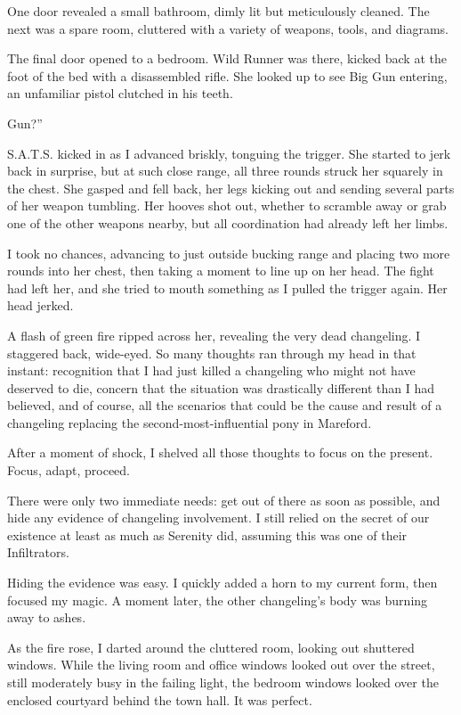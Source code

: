 One door revealed a small bathroom, dimly lit but meticulously cleaned. The next was a spare room, cluttered with a variety of weapons, tools, and diagrams.

The final door opened to a bedroom. Wild Runner was there, kicked back at the foot of the bed with a disassembled rifle. She looked up to see Big Gun entering, an unfamiliar pistol clutched in his teeth.

\leavevmode{}Gun?”

S.A.T.S. kicked in as I advanced briskly, tonguing the trigger. She started to jerk back in surprise, but at such close range, all three rounds struck her squarely in the chest. She gasped and fell back, her legs kicking out and sending several parts of her weapon tumbling. Her hooves shot out, whether to scramble away or grab one of the other weapons nearby, but all coordination had already left her limbs.

I took no chances, advancing to just outside bucking range and placing two more rounds into her chest, then taking a moment to line up on her head. The fight had left her, and she tried to mouth something as I pulled the trigger again. Her head jerked.

A flash of green fire ripped across her, revealing the very dead changeling. I staggered back, wide-eyed. So many thoughts ran through my head in that instant: recognition that I had just killed a changeling who might not have deserved to die, concern that the situation was drastically different than I had believed, and of course, all the scenarios that could be the cause and result of a changeling replacing the second-most-influential pony in Mareford.

After a moment of shock, I shelved all those thoughts to focus on the present. Focus, adapt, proceed.

There were only two immediate needs: get out of there as soon as possible, and hide any evidence of changeling involvement. I still relied on the secret of our existence at least as much as Serenity did, assuming this was one of their Infiltrators.

Hiding the evidence was easy. I quickly added a horn to my current form, then focused my magic. A moment later, the other changeling’s body was burning away to ashes.

As the fire rose, I darted around the cluttered room, looking out shuttered windows. While the living room and office windows looked out over the street, still moderately busy in the failing light, the bedroom windows looked over the enclosed courtyard behind the town hall. It was perfect.

